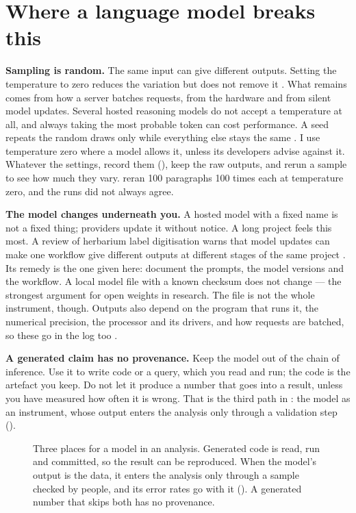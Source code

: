 \section{Where a language model breaks this}

\textbf{Sampling is random.} The same input can give different outputs. Setting
the temperature to zero reduces the variation but does not remove it
\parencite{ouyang2024nondeterminism,coqueret2026randomness}. What remains
comes from how a server batches requests, from the hardware and from silent
model updates. Several hosted reasoning models do not accept a temperature at
all, and always taking the most probable token can cost performance. A seed
repeats the random draws only while everything else stays the same
\parencite{coqueret2026randomness}. I use temperature zero where a model
allows it, unless its developers advise against it. Whatever the settings,
record them (), keep the raw outputs, and rerun a sample
to see how much they vary. \textcite{keck2026interactions} reran 100
paragraphs 100 times each at temperature zero, and the runs did not always
agree.

\textbf{The model changes underneath you.} A hosted model with a fixed name is
not a fixed thing; providers update it without notice. A long project feels
this most. A review of herbarium label digitisation warns that model updates
can make one workflow give different outputs at different stages of the same
project \parencite{abbad2026herbarium}. Its remedy is the one given here:
document the prompts, the model versions and the workflow. A local model file with a
known checksum does not change --- the strongest argument for open weights in
research. The file is not the whole instrument, though. Outputs also depend on
the program that runs it, the numerical precision, the processor and its
drivers, and how requests are batched, so these go in the log too
\parencite{coqueret2026randomness}.

\textbf{A generated claim has no provenance.} Keep the model out of the chain of
inference. Use it to write code or a query, which you read and run; the code is
the artefact you keep. Do not let it produce a number that goes into a result,
unless you have measured how often it is wrong. That is the third path in
: the model as an instrument, whose output enters the analysis
only through a validation step ().

\begin{figure}[htbp]
\centering
{}
\caption{Three places for a model in an analysis. Generated code is read, run
and committed, so the result can be reproduced. When the model's output is the
data, it enters the analysis only through a sample checked by people, and its
error rates go with it (). A generated number that skips
both has no provenance.}
\label{fig:chain}
\end{figure}

